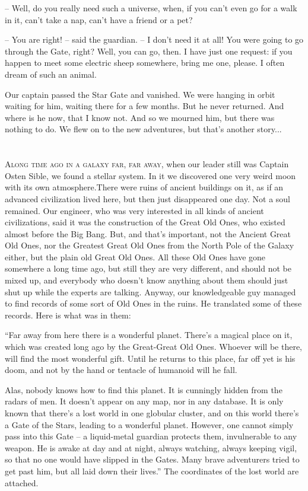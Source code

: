 \documentclass[ebook,twoside,final,openright]{memoir}
\begin{document}
– Well, do you really need such a universe, when, if you can’t even go for a walk in it, can’t take a nap, can’t have a friend or a pet?\par
– You are right! – said the guardian. – I don’t need it at all! You were going to go through the Gate, right? Well, you can go, then. I have just one request: if you happen to meet some electric sheep somewhere, bring me one, please. I often dream of such an animal.\par
Our captain passed the Star Gate and vanished. We were hanging in orbit waiting for him, waiting there for a few months. But he never returned. And where is he now, that I know not. And so we mourned him, but there was nothing to do. We flew on to the new adventures, but that's another story...
\chapter{}
\par
\lettrine{A}{long time ago in a galaxy far, far away,} when our leader still was Captain Osten Sible, we found a stellar system. In it we discovered one very weird moon with its own atmosphere.There were ruins of ancient buildings on it, as if an advanced civilization lived here, but then just disappeared one day. Not a soul remained. Our engineer, who was very interested in all kinds of ancient civilizations, said it was the construction of the Great Old Ones, who existed almost before the Big Bang. But, and that’s important, not the Ancient Great Old Ones, nor the Greatest Great Old Ones from the North Pole of the Galaxy either, but the plain old Great Old Ones. All these Old Ones have gone somewhere a long time ago, but still they are very different, and should not be mixed up, and everybody who doesn’t know anything about them should just shut up while the experts are talking. Anyway, our knowledgeable guy managed to find records of some sort of Old Ones in the ruins. He translated some of these records. Here is what was in them:\par
\par
“Far away from here there is a wonderful planet. There’s a magical place on it, which was created long ago by the Great-Great Old Ones. Whoever will be there, will find the most wonderful gift. Until he returns to this place, far off yet is his doom, and not by the hand or tentacle of humanoid will he fall. \par
Alas, nobody knows how to find this planet. It is cunningly hidden from the radars of men. It doesn’t appear on any map, nor in any database. It is only known that there’s a lost world in one globular cluster, and on this world there’s a Gate of the Stars, leading to a wonderful planet. However, one cannot simply pass into this Gate – a liquid-metal guardian protects them, invulnerable to any weapon. He is awake at day and at night, always watching, always keeping vigil, so that no one would have slipped in the Gates. Many brave adventurers tried to get past him, but all laid down their lives.” The coordinates of the lost world are attached.\par
\end{document}

